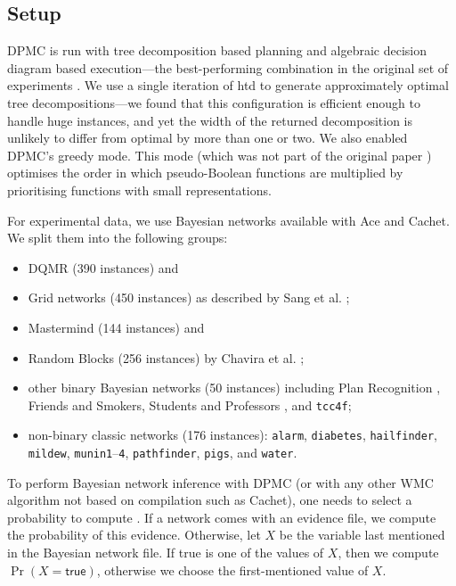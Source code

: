 \documentclass[runningheads]{llncs}
\begin{document}
\subsection{Setup}

\textsf{DPMC} is run with tree decomposition based planning and algebraic
decision diagram based execution---the best-performing combination in the
original set of experiments \cite{DBLP:conf/cp/DudekPV20}. We use a single
iteration of \textsf{htd} \cite{DBLP:conf/cpaior/AbseherMW17} to generate
approximately optimal tree decompositions---we found that this configuration
is efficient enough to handle huge instances, and yet the width of the
returned decomposition is unlikely to differ from optimal by more than one or
two. We also enabled \textsf{DPMC}'s greedy mode. This mode (which was not part
of the original paper \cite{DBLP:conf/cp/DudekPV20}) optimises the order in
which pseudo-Boolean functions are multiplied by prioritising functions with
small representations.

For experimental data, we use Bayesian networks available with \textsf{Ace} and
\textsf{Cachet}. We split them into the following groups:
\begin{itemize}
\item DQMR (390 instances) and
\item Grid networks (450 instances) as described by Sang et al.
  \cite{DBLP:conf/aaai/SangBK05};
\item Mastermind (144 instances) and
\item Random Blocks (256 instances) by Chavira et al.
  \cite{DBLP:journals/ijar/ChaviraDJ06};
\item other binary Bayesian networks (50 instances) including Plan Recognition
  \cite{DBLP:conf/aaai/SangBK05}, Friends and Smokers, Students and Professors
  \cite{DBLP:journals/ijar/ChaviraDJ06}, and \texttt{tcc4f};
\item non-binary classic networks (176 instances): \texttt{alarm},
  \texttt{diabetes}, \texttt{hailfinder}, \texttt{mildew},
  \texttt{munin1}--\texttt{4}, \texttt{pathfinder}, \texttt{pigs}, and
  \texttt{water}.
\end{itemize}

To perform Bayesian network inference with \textsf{DPMC} (or with any
other WMC algorithm not based on compilation such as \textsf{Cachet}), one
needs to select a probability to compute
\cite{DBLP:conf/cp/DudekPV20,DBLP:conf/sat/SangBBKP04}. If a network comes
with an evidence file, we compute the probability of this evidence. Otherwise,
let $X$ be the variable last mentioned in the Bayesian network file. If
\textsf{true} is one of the values of $X$, then we compute $\Pr(X =
\textsf{true})$, otherwise we choose the first-mentioned value of $X$.
\end{document}
